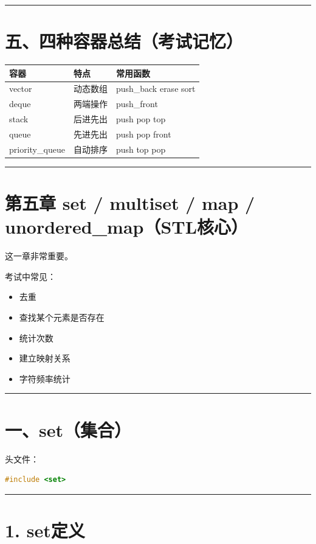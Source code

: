 \documentclass[9pt,twocolumn]{extarticle}
\begin{document}
\noindent\rule{\linewidth}{0.4pt}

\section{五、四种容器总结（考试记忆）}

\begin{table}[h]
\centering
\begin{tabular}{|l|l|l|}
\hline
容器 & 特点 & 常用函数 \\ \hline
vector & 动态数组 & push\_back erase sort \\ \hline
deque & 两端操作 & push\_front \\ \hline
stack & 后进先出 & push pop top \\ \hline
queue & 先进先出 & push pop front \\ \hline
priority\_queue & 自动排序 & push top pop \\ \hline
\end{tabular}
\end{table}

\noindent\rule{\linewidth}{0.4pt}

\section{第五章 set / multiset / map / unordered\_map（STL核心）}

这一章非常重要。

考试中常见：
\begin{itemize}
    \item 去重
    \item 查找某个元素是否存在
    \item 统计次数
    \item 建立映射关系
    \item 字符频率统计
\end{itemize}

\noindent\rule{\linewidth}{0.4pt}

\section{一、set（集合）}

头文件：
\begin{lstlisting}[language=C++]
#include <set>
\end{lstlisting}

\noindent\rule{\linewidth}{0.4pt}

\section{1. set定义}
\end{document}
